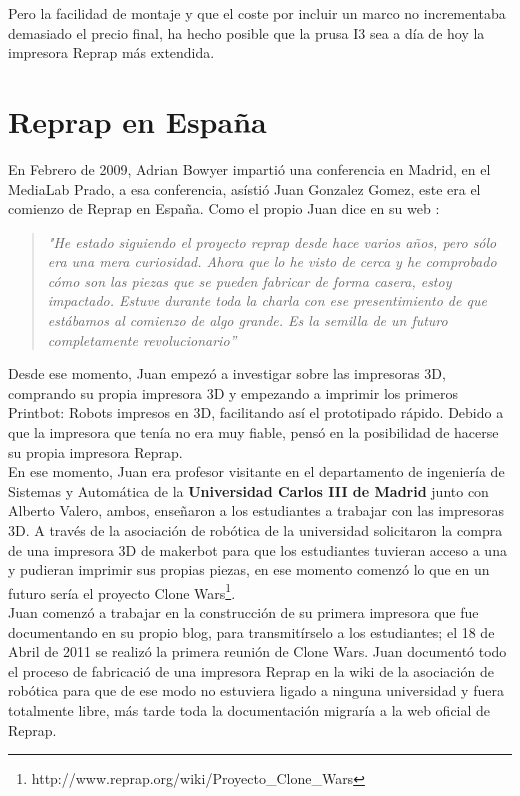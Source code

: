 Pero la facilidad de montaje y que el coste por incluir un marco no incrementaba demasiado el precio final, ha hecho posible que la prusa I3 sea a día de hoy la impresora Reprap más extendida.

\section{Reprap en España}

En Febrero de 2009, Adrian Bowyer impartió una conferencia en Madrid, en el MediaLab Prado, a esa conferencia, asístió Juan Gonzalez Gomez, este era el comienzo de Reprap en España. Como el propio Juan dice en su web \cite{juan1}:

\begin{quotation}
    \emph{
    "He estado siguiendo el proyecto reprap desde hace varios años, pero sólo era una mera curiosidad. Ahora que lo he visto de cerca y he comprobado cómo son las piezas que se pueden fabricar de forma casera, estoy impactado. Estuve durante toda la charla con ese presentimiento de que estábamos al comienzo de algo grande. Es la semilla de un futuro completamente revolucionario”}
\end{quotation}

Desde ese momento, Juan empezó a investigar sobre las impresoras 3D, comprando su propia impresora 3D \cite{juanR1} y empezando a imprimir los primeros Printbot: Robots impresos en 3D, facilitando así el prototipado rápido. Debido a que la impresora que tenía no era muy fiable, pensó en la posibilidad de hacerse su propia impresora Reprap.\\

En ese momento, Juan era profesor visitante en el departamento de ingeniería de Sistemas y Automática de la \textbf{Universidad Carlos III de Madrid} junto con Alberto Valero, ambos, enseñaron a los estudiantes a trabajar con las impresoras 3D. A través de la asociación de robótica de la universidad solicitaron la compra de una impresora 3D de makerbot para que los estudiantes tuvieran acceso a una y pudieran imprimir sus propias piezas, en ese momento comenzó lo que en un futuro sería el proyecto Clone Wars\footnote{http://www.reprap.org/wiki/Proyecto\_Clone\_Wars}.\\

Juan comenzó a trabajar en la construcción de su primera impresora que fue documentando en su propio blog, para transmitírselo a los estudiantes; el 18 de Abril de 2011 se realizó la primera reunión de Clone Wars. Juan documentó todo el proceso de fabricació de una impresora Reprap en la wiki de la asociación de robótica para que de ese modo no estuviera ligado a ninguna universidad y fuera totalmente libre, más tarde toda la documentación migraría a la web oficial de Reprap.
